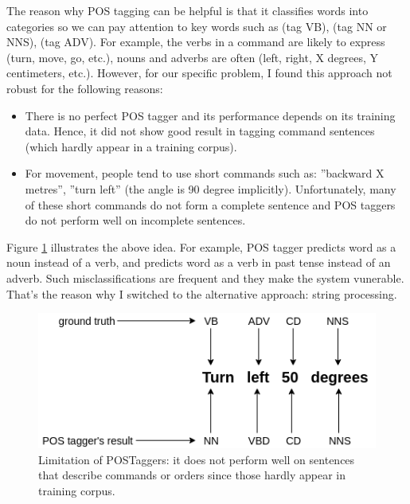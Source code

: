 The reason why POS tagging can be helpful is that it classifies words into categories so we can pay attention to key words such as  (tag VB),  (tag NN or NNS),  (tag ADV). For example, the verbs in a command are likely to express  (turn, move, go, etc.), nouns and adverbs are often  (left, right, X degrees, Y centimeters, etc.). However, for our specific problem, I found this approach not robust for the following reasons:
\begin{itemize}
	\item There is no perfect POS tagger and its performance depends on its training data. Hence, it did not show good result in tagging command sentences (which hardly appear in a training corpus).
	\item For movement, people tend to use short commands such as: ”backward X metres”, ”turn left” (the angle is 90 degree implicitly). Unfortunately, many of these short commands do not form a complete sentence and POS taggers do not perform well on incomplete sentences.
\end{itemize}
Figure \ref{fig:POSTagLimits} illustrates the above idea. For example, POS tagger predicts word  as a noun instead of a verb, and predicts word  as a verb in past tense instead of an adverb. Such misclassifications are frequent and they make the system vunerable. That's the reason why I switched to the alternative approach: string processing.

\begin{figure}[tb]
	\centering
	\includegraphics[width=0.7\hsize]{./figures/POSTagLimits}
	\caption{Limitation of POSTaggers: it does not perform well on sentences that describe commands or orders since those hardly appear in training corpus.}
	\label{fig:POSTagLimits}
\end{figure}

